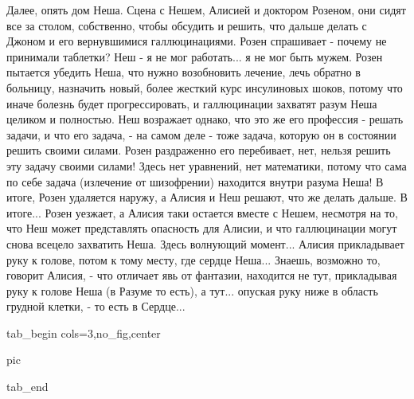 Далее, опять дом Неша. Сцена с Нешем, Алисией и доктором Розеном, они сидят все
за столом, собственно, чтобы обсудить и решить, что дальше делать с Джоном и
его вернувшимися галлюцинациями. Розен спрашивает - почему не принимали
таблетки? Неш - я не мог работать...  я не мог быть мужем. Розен пытается
убедить Неша, что нужно возобновить лечение, лечь обратно в больницу, назначить
новый, более жесткий курс инсулиновых шоков, потому что иначе болезнь будет
прогрессировать, и галлюцинации захватят разум Неша целиком и полностью. Неш
возражает однако, что это же его профессия - решать задачи, и что его задача, -
на самом деле - тоже задача, которую он в состоянии решить своими силами. Розен
раздраженно его перебивает, нет, нельзя решить эту задачу своими силами! Здесь
нет уравнений, нет математики, потому что сама по себе задача (излечение от
шизофрении) находится внутри разума Неша!  В итоге, Розен удаляется наружу, а
Алисия и Неш решают, что же делать дальше. В итоге... Розен уезжает, а Алисия
таки остается вместе с Нешем, несмотря на то, что Неш может представлять
опасность для Алисии, и что галлюцинации могут снова всецело захватить Неша.
Здесь волнующий момент... Алисия прикладывает руку к голове, потом к тому
месту, где сердце Неша... Знаешь, возможно то, говорит Алисия, - что отличает
явь от фантазии, находится не тут, прикладывая руку к голове Неша (в Разуме то
есть), а тут... опуская руку ниже в область грудной клетки, - то есть в
Сердце... 


\ifcmt
  tab_begin cols=3,no_fig,center

     pic 

  tab_end
\fi



